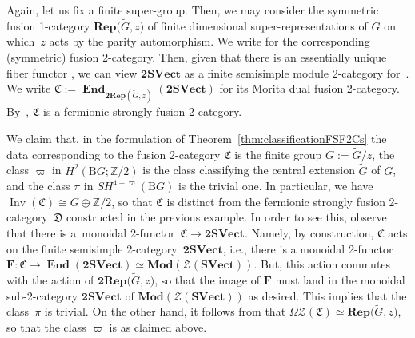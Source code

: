 \documentclass[10pt,a4paper]{amsart}
\numberwithin{equation}{section}
\begin{document}
\begin{Example}\label{ex:actionnoextension}
Again, let us fix  a finite super-group. Then, we may consider the symmetric fusion 1-category $\mathbf{Rep}\big(\widetilde{G},z\big)$ of finite dimensional super-representations of $G$ on which~$z$ acts by the parity automorphism. We write  for the corresponding (symmetric) fusion 2-category. Then, given that there is an essentially unique fiber functor , we can view $\mathbf{2SVect}$ as a finite semisimple module 2-category for~. We write
$\mathfrak{C}:=\mathbf{\operatorname{End}}_{\mathbf{2Rep}(\widetilde{G},z)}(\mathbf{2SVect})
$
 for its Morita dual fusion 2-category. By~\cite[Lemma~3.2.1]{D9}, $\mathfrak{C}$ is a fermionic strongly fusion 2-category.

We claim that, in the formulation of Theorem~\ref{thm:classificationFSF2Cs} the data corresponding to the fusion 2-category $\mathfrak{C}$ is the finite group $G:=\widetilde{G}/z$, the class $\varpi$ in $H^2(\mathrm{B}G;\mathbb{Z}/2)$ is the class classifying the central extension $\widetilde{G}$ of $G$, and the class $\pi$ in $SH^{4+\varpi}(\mathrm{B}G)$ is the trivial one. In particular, we have~${\operatorname{Inv}(\mathfrak{C})\cong G\oplus\mathbb{Z}/2}$, so that $\mathfrak{C}$ is distinct from the fermionic strongly fusion 2-category~$\mathfrak{D}$ constructed in the previous example. In order to see this, observe that there is a~monoidal 2-functor~${\mathfrak{C}\rightarrow\mathbf{2SVect}}$. Namely, by construction, $\mathfrak{C}$ acts on the finite semisimple 2-category~$\mathbf{2SVect}$, i.e., there is a monoidal 2-functor $\mathbf{F}\colon\mathfrak{C}\rightarrow \mathbf{\operatorname{End}}(\mathbf{2SVect})\simeq\mathbf{Mod}(\mathcal{Z}(\mathbf{SVect}))$. But, this action commutes with the action of $\mathbf{2Rep}\big(\widetilde{G},z\big)$, so that the image of $\mathbf{F}$ must land in the monoidal sub-2-category $\mathbf{2SVect}$ of $\mathbf{Mod}(\mathcal{Z}(\mathbf{SVect}))$ as desired. This implies that the class~$\pi$ is trivial. On the other hand, it follows from \cite[Theorem~2.3.2]{D9} that $\Omega\mathscr{Z}(\mathfrak{C})\simeq \mathbf{Rep}\big(\widetilde{G},z\big)$, so that the class $\varpi$ is as claimed above.
\end{Example}
\end{document}
